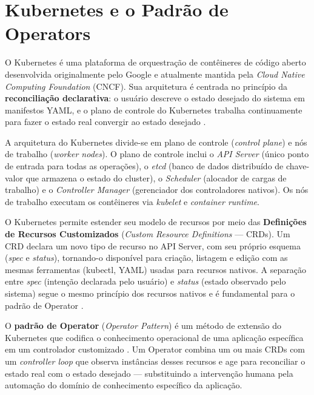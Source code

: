 \section{Kubernetes e o Padrão de Operators}
\label{sec:kubernetes}

O Kubernetes é uma plataforma de orquestração de contêineres de código aberto desenvolvida originalmente pelo Google e atualmente mantida pela \textit{Cloud Native Computing Foundation} (CNCF). Sua arquitetura é centrada no princípio da \textbf{reconciliação declarativa}: o usuário descreve o estado desejado do sistema em manifestos YAML, e o plano de controle do Kubernetes trabalha continuamente para fazer o estado real convergir ao estado desejado \cite{CNCF2023}.

A arquitetura do Kubernetes divide-se em plano de controle (\textit{control plane}) e nós de trabalho (\textit{worker nodes}). O plano de controle inclui o \textit{API Server} (único ponto de entrada para todas as operações), o \textit{etcd} (banco de dados distribuído de chave-valor que armazena o estado do cluster), o \textit{Scheduler} (alocador de cargas de trabalho) e o \textit{Controller Manager} (gerenciador dos controladores nativos). Os nós de trabalho executam os contêineres via \textit{kubelet} e \textit{container runtime}.

O Kubernetes permite estender seu modelo de recursos por meio das \textbf{Definições de Recursos Customizados} (\textit{Custom Resource Definitions} — CRDs). Um CRD declara um novo tipo de recurso no API Server, com seu próprio esquema (\textit{spec} e \textit{status}), tornando-o disponível para criação, listagem e edição com as mesmas ferramentas (kubectl, YAML) usadas para recursos nativos. A separação entre \textit{spec} (intenção declarada pelo usuário) e \textit{status} (estado observado pelo sistema) segue o mesmo princípio dos recursos nativos e é fundamental para o padrão de Operator \cite{KUBEBUILDER2024}.

O \textbf{padrão de Operator} (\textit{Operator Pattern}) é um método de extensão do Kubernetes que codifica o conhecimento operacional de uma aplicação específica em um controlador customizado \cite{CNCF2023}. Um Operator combina um ou mais CRDs com um \textit{controller loop} que observa instâncias desses recursos e age para reconciliar o estado real com o estado desejado — substituindo a intervenção humana pela automação do domínio de conhecimento específico da aplicação.

